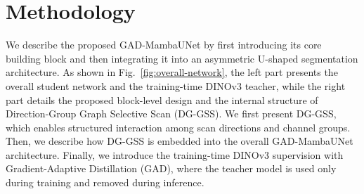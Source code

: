 \section{Methodology}


We describe the proposed GAD-MambaUNet by first introducing its core building block and then integrating it into an asymmetric U-shaped segmentation architecture. 
As shown in Fig.~\ref{fig:overall-network}, the left part presents the overall student network and the training-time DINOv3 teacher, while the right part details the proposed block-level design and the internal structure of Direction-Group Graph Selective Scan (DG-GSS). 
We first present DG-GSS, which enables structured interaction among scan directions and channel groups. Then, we describe how DG-GSS is embedded into the overall GAD-MambaUNet architecture. Finally, we introduce the training-time DINOv3 supervision with Gradient-Adaptive Distillation (GAD), where the teacher model is used only during training and removed during inference.







